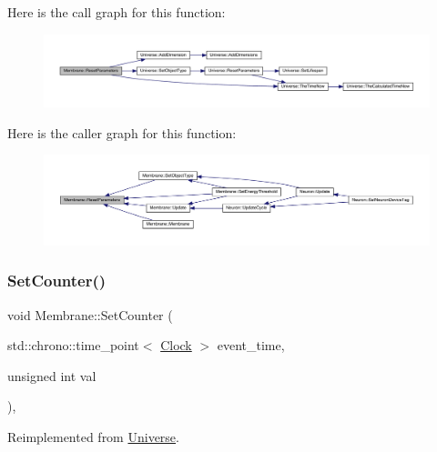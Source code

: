 Here is the call graph for this function\+:
\nopagebreak
\begin{figure}[H]
\begin{center}
\leavevmode
\includegraphics[width=350pt]{class_membrane_a9c49462cf63495381a52e2defc80b1e4_cgraph}
\end{center}
\end{figure}
Here is the caller graph for this function\+:
\nopagebreak
\begin{figure}[H]
\begin{center}
\leavevmode
\includegraphics[width=350pt]{class_membrane_a9c49462cf63495381a52e2defc80b1e4_icgraph}
\end{center}
\end{figure}
\mbox{\label{class_membrane_a4bff43b38d7046867f220392a39cc272}} 
\subsubsection{\texorpdfstring{Set\+Counter()}{SetCounter()}}
{\footnotesize\ttfamily void Membrane\+::\+Set\+Counter (\begin{DoxyParamCaption}\item[{std\+::chrono\+::time\+\_\+point$<$ \hyperlink{universe_8h_a0ef8d951d1ca5ab3cfaf7ab4c7a6fd80}{Clock} $>$}]{event\+\_\+time,  }\item[{unsigned int}]{val }\end{DoxyParamCaption})\hspace{0.3cm}{\ttfamily [inline]}, {\ttfamily [virtual]}}



Reimplemented from \hyperlink{class_universe_aa22202ae740eb1355529afcb13285e91}{Universe}.



